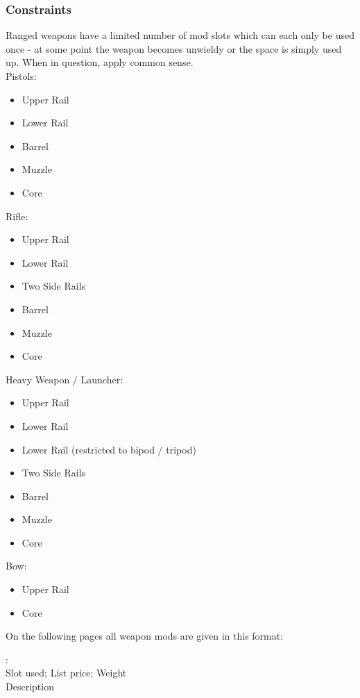\documentclass[12pt,a4paper,openany]{book}
\newenvironment{exampleblock}[1][1]
{\par\hfill\begin{minipage}{\dimexpr\textwidth-#1cm}}
{\end{minipage}\par}
\newcommand{\ul}[1]{\underline{\smash{#1}}}
\newcommand{\weaponmod}[5]{
	\textbf{\ul{#1}}:\\
	#3; #4; #5\\
	#2
	\par
}
\begin{document}
	\subsubsection{Constraints}
	Ranged weapons have a limited number of mod slots which can each only be used once - at some point the weapon becomes unwieldy or the space is simply used up. When in question, apply common sense.\\
	Pistols:
	\vspace{-10mm}
	\begin{itemize}
		\setlength\itemsep{-8mm}
		\item Upper Rail
		\item Lower Rail
		\item Barrel
		\item Muzzle
		\item Core
	\end{itemize}
	Rifle:
	\vspace{-10mm}
	\begin{itemize}
		\setlength\itemsep{-8mm}
		\item Upper Rail
		\item Lower Rail
		\item Two Side Rails
		\item Barrel
		\item Muzzle
		\item Core
	\end{itemize}
	Heavy Weapon / Launcher:
	\vspace{-10mm}
	\begin{itemize}
		\setlength\itemsep{-8mm}
		\item Upper Rail
		\item Lower Rail
		\item Lower Rail (restricted to bipod / tripod)
		\item Two Side Rails
		\item Barrel
		\item Muzzle
		\item Core
	\end{itemize}
	Bow:
	\vspace{-10mm}
	\begin{itemize}
		\setlength\itemsep{-8mm}
		\item Upper Rail
		\item Core
	\end{itemize}
	On the following pages all weapon mods are given in this format:\par
	\vspace{-5mm}
	\begin{exampleblock}
		\weaponmod{Name}{Description}{Slot used}{List price}{Weight}
	\end{exampleblock}
\end{document}
